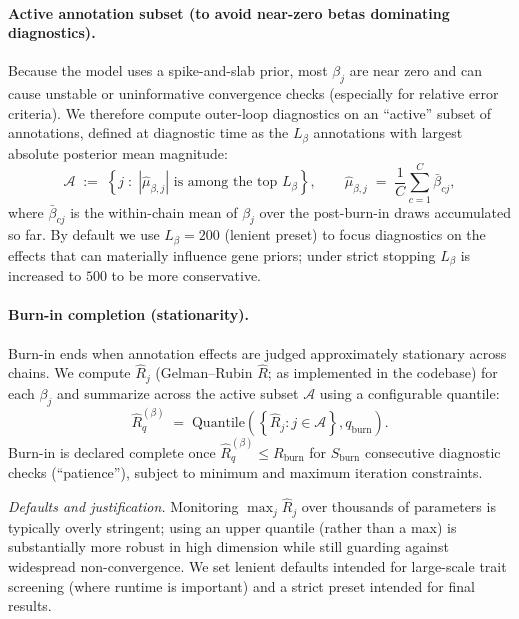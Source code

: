 \documentclass[11pt]{article}
\begin{document}
\paragraph{Active annotation subset (to avoid near-zero betas dominating diagnostics).}
Because the model uses a spike-and-slab prior, most $\beta_j$ are near zero and can cause unstable
or uninformative convergence checks (especially for relative error criteria). We therefore compute
outer-loop diagnostics on an ``active'' subset of annotations, defined at diagnostic time as the
$L_\beta$ annotations with largest absolute posterior mean magnitude:
\[
\mathcal{A} \;:=\; \left\{ j \;:\; |\hat\mu_{\beta,j}| \text{ is among the top } L_\beta \right\},
\qquad
\hat\mu_{\beta,j} \;=\; \frac{1}{C}\sum_{c=1}^C \bar\beta_{c j},
\]
where $\bar\beta_{c j}$ is the within-chain mean of $\beta_j$ over the post-burn-in draws accumulated
so far. By default we use $L_\beta=200$ (lenient preset) to focus diagnostics on the effects that can
materially influence gene priors; under strict stopping $L_\beta$ is increased to $500$ to be more
conservative.

\paragraph{Burn-in completion (stationarity).}
Burn-in ends when annotation effects are judged approximately stationary across chains. We compute
$\widehat{R}_j$ (Gelman--Rubin $\widehat{R}$; as implemented in the codebase) for each $\beta_j$ and
summarize across the active subset $\mathcal{A}$ using a configurable quantile:
\[
\widehat{R}^{(\beta)}_{q} \;=\; \mathrm{Quantile}\left(\left\{\widehat{R}_j : j \in \mathcal{A}\right\}, q_{\mathrm{burn}}\right).
\]
Burn-in is declared complete once $\widehat{R}^{(\beta)}_{q} \le R_{\mathrm{burn}}$ for
$S_{\mathrm{burn}}$ consecutive diagnostic checks (``patience''), subject to minimum and maximum
iteration constraints.

\emph{Defaults and justification.}
Monitoring $\max_j \widehat{R}_j$ over thousands of parameters is typically overly stringent; using
an upper quantile (rather than a max) is substantially more robust in high dimension while still
guarding against widespread non-convergence. We set lenient defaults intended for large-scale trait
screening (where runtime is important) and a strict preset intended for final results.
\end{document}
